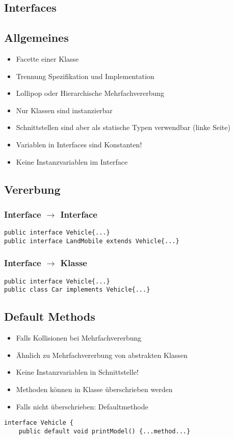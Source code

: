 \begin{multicols*}{5}
	\columnbreak




\section{Interfaces}
	\subsection{Allgemeines}
	\begin{itemize}
		\item Facette einer Klasse
		\item Trennung Spezifikation und Implementation
		\item Lollipop oder Hierarchische Mehrfachvererbung
		\item Nur Klassen sind instanzierbar
		\item Schnittstellen sind aber als statische Typen verwendbar (linke Seite)
		\item Variablen in Interfaces sind Konstanten!
		\item Keine Instanzvariablen im Interface
	\end{itemize}
	\subsection{Vererbung}
		\subsubsection{Interface $\rightarrow$ Interface}
			\begin{lstlisting}
public interface Vehicle{...}
public interface LandMobile extends Vehicle{...}
			\end{lstlisting}
		\subsubsection{Interface $\rightarrow$ Klasse}
			\begin{lstlisting}
public interface Vehicle{...}
public class Car implements Vehicle{...}
			\end{lstlisting}
	\subsection{Default Methods}
	\begin{itemize}
		\item Falls Kollisionen bei Mehrfachvererbung 
		\item Ähnlich zu Mehrfachvererbung von abstrakten Klassen
		\item Keine Instanzvariablen in Schnittstelle!
		\item Methoden können in Klasse überschrieben werden
		\item Falls nicht überschrieben: Defaultmethode
	\end{itemize}
		\begin{lstlisting}
interface Vehicle {
	public default void printModel() {...method...}
		\end{lstlisting}

\end{multicols*}
